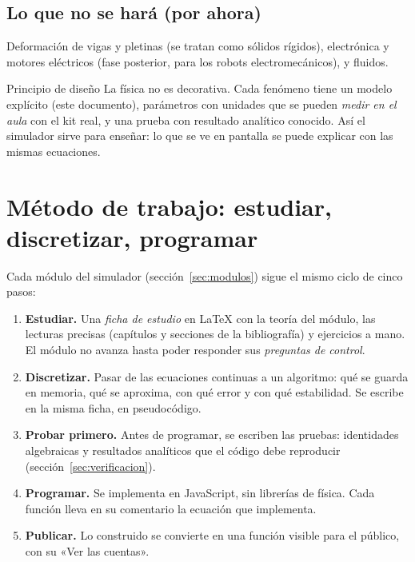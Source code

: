 \documentclass[11pt,a4paper]{article}
\numberwithin{equation}{section}
\begin{document}
\subsection{Lo que no se hará (por ahora)}
Deformación de vigas y pletinas (se tratan como sólidos rígidos), electrónica y motores eléctricos (fase
posterior, para los robots electromecánicos), y fluidos.

\begin{decision}{Principio de diseño}
La física no es decorativa. Cada fenómeno tiene un modelo explícito (este documento), parámetros con unidades que
se pueden \emph{medir en el aula} con el kit real, y una prueba con resultado analítico conocido. Así el simulador
sirve para enseñar: lo que se ve en pantalla se puede explicar con las mismas ecuaciones.
\end{decision}

\section{Método de trabajo: estudiar, discretizar, programar}\label{sec:metodo}

Cada módulo del simulador (sección~\ref{sec:modulos}) sigue el mismo ciclo de cinco pasos:

\begin{enumerate}[leftmargin=*]
  \item \textbf{Estudiar.} Una \emph{ficha de estudio} en LaTeX con la teoría del módulo, las lecturas precisas
        (capítulos y secciones de la bibliografía) y ejercicios a mano. El módulo no avanza hasta poder responder sus
        \emph{preguntas de control}.
  \item \textbf{Discretizar.} Pasar de las ecuaciones continuas a un algoritmo: qué se guarda en memoria, qué se
        aproxima, con qué error y con qué estabilidad. Se escribe en la misma ficha, en pseudocódigo.
  \item \textbf{Probar primero.} Antes de programar, se escriben las pruebas: identidades algebraicas y resultados
        analíticos que el código debe reproducir (sección~\ref{sec:verificacion}).
  \item \textbf{Programar.} Se implementa en JavaScript, sin librerías de física. Cada función lleva en su comentario
        la ecuación que implementa.
  \item \textbf{Publicar.} Lo construido se convierte en una función visible para el público, con su «Ver las cuentas».
\end{enumerate}
\end{document}
